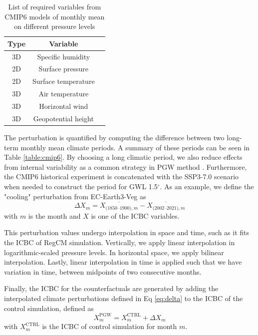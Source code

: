 \begin{table}[h] 
\centering
\begin{tabular}{ccc} 
\hline
\textbf{Type} & \textbf{Variable} \\
\hline
3D	&Specific humidity \\
2D	&Surface pressure \\
2D	&Surface temperature \\
3D	&Air temperature \\
3D	&Horizontal wind \\
3D	&Geopotential height \\
\hline
\end{tabular}
\caption{List of required variables from CMIP6 models of monthly mean on different pressure levels}
\label{table:cmip6_vars}
\end{table}

The perturbation is quantified by computing the difference between two long-term monthly mean climate periods. A summary of these periods can be seen in Table \ref{table:cmip6}. By choosing a long climatic period, we also reduce effects from internal variability as a common strategy in PGW method \citep{brogli2023pseudo}. Furthermore, the CMIP6 historical experiment is concatenated with the SSP3-7.0 scenario when needed to construct the period for GWL 1.5$^\circ$. As an example, we define the "cooling" perturbation from EC-Earth3-Veg as
\begin{equation} \label{eq:delta}
    \Delta X_m = \overline{X_{\text{(1850--1900)}, m}} - \overline{X_{\text{(2002--2021)}, m}}
\end{equation}
with $m$ is the month and $X$ is one of the ICBC variables.

This perturbation values undergo interpolation in space and time, such as it fits the ICBC of RegCM simulation. Vertically, we apply linear interpolation in logarithmic-scaled pressure levels. In horizontal space, we apply bilinear interpolation. Lastly, linear interpolation in time is applied such that we have variation in time, between midpoints of two consecutive months.

Finally, the ICBC for the counterfactuals are generated by adding the interpolated climate perturbations defined in Eq \eqref{eq:delta} to the ICBC of the control simulation, defined as
\begin{equation}
    X^{\text{PGW}}_m = X^{\text{CTRL}}_m + \Delta X_m
\end{equation}
with $X^{\text{CTRL}}_m$ is the ICBC of control simulation for month $m$.

